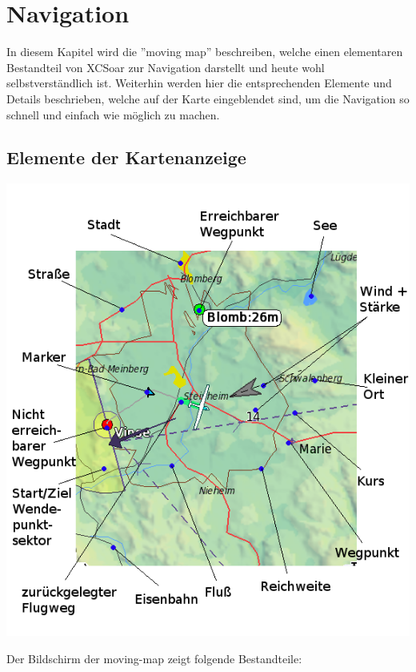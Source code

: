 \chapter{Navigation}\label{cha:navigation}

In diesem Kapitel wird die ''moving map'' beschreiben, welche einen elementaren Bestandteil von \textsf{XCSoar} zur Navigation darstellt und heute wohl selbstverständlich ist. Weiterhin werden hier die entsprechenden Elemente und Details beschrieben, welche auf der Karte eingeblendet sind, um die Navigation so schnell und einfach wie möglich zu machen.

\section{Elemente der Kartenanzeige}

\begin{maxipage}
\includegraphics[angle=0,width=0.9\linewidth,keepaspectratio='true']{figures/fig-map.png}
\end{maxipage}

Der Bildschirm der moving-map zeigt folgende Bestandteile:

